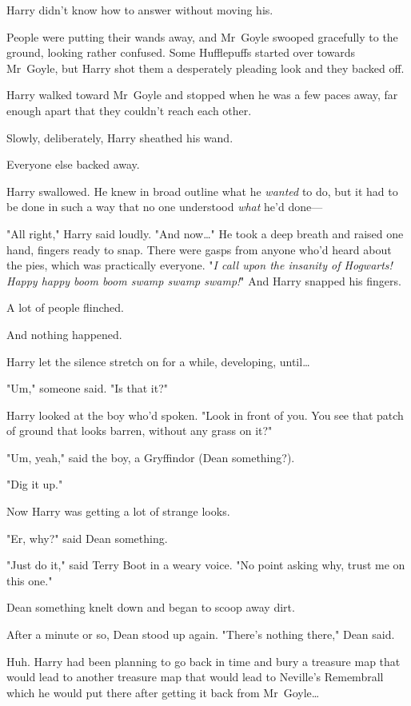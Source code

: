 Harry didn’t know how to answer without moving his.

People were putting their wands away, and Mr~Goyle swooped gracefully to the
ground, looking rather confused. Some Hufflepuffs started over towards
Mr~Goyle, but Harry shot them a desperately pleading look and they backed off.

Harry walked toward Mr~Goyle and stopped when he was a few paces away, far
enough apart that they couldn’t reach each other.

Slowly, deliberately, Harry sheathed his wand.

Everyone else backed away.

Harry swallowed. He knew in broad outline what he \emph{wanted} to do, but it
had to be done in such a way that no one understood \emph{what} he’d done—

"All right," Harry said loudly. "And now…" He took a deep breath and
raised one hand, fingers ready to snap. There were gasps from anyone who’d
heard about the pies, which was practically everyone. "\emph{I call upon the
insanity of Hogwarts! Happy happy boom boom swamp swamp swamp!}" And Harry
snapped his fingers.

A lot of people flinched.

And nothing happened.

Harry let the silence stretch on for a while, developing, until…

"Um," someone said. "Is that it?"

Harry looked at the boy who’d spoken. "Look in front of you. You see that patch
of ground that looks barren, without any grass on it?"

"Um, yeah," said the boy, a Gryffindor (Dean something?).

"Dig it up."

Now Harry was getting a lot of strange looks.

"Er, why?" said Dean something.

"Just do it," said Terry Boot in a weary voice. "No point asking why, trust me
on this one."

Dean something knelt down and began to scoop away dirt.

After a minute or so, Dean stood up again. "There’s nothing there," Dean said.

Huh. Harry had been planning to go back in time and bury a treasure map that
would lead to another treasure map that would lead to Neville’s Remembrall
which he would put there after getting it back from Mr~Goyle…

